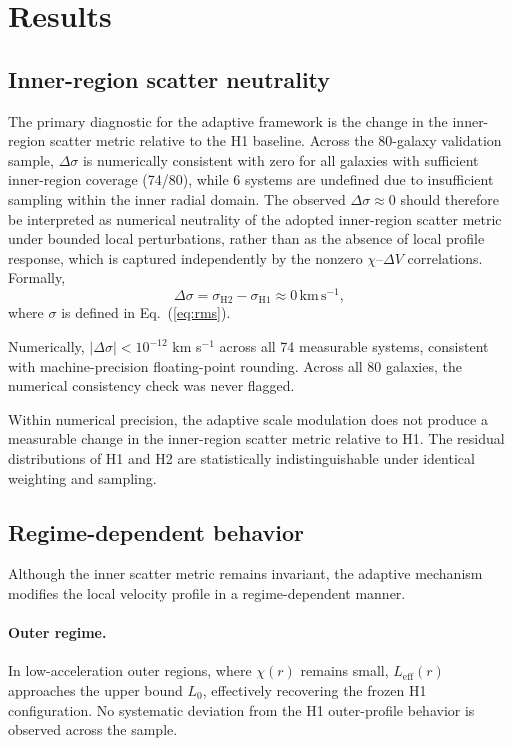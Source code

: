 \documentclass{aa}
\begin{document}
\section{Results}

\subsection{Inner-region scatter neutrality}

The primary diagnostic for the adaptive framework is the change in the
inner-region scatter metric relative to the H1 baseline. Across the
80-galaxy validation sample, $\Delta\sigma$ is numerically consistent
with zero for all galaxies with sufficient inner-region coverage (74/80),
while 6 systems are undefined due to insufficient sampling within the
inner radial domain.
The observed $\Delta\sigma \approx 0$ should therefore be interpreted as numerical neutrality of the adopted inner-region scatter metric under bounded local perturbations, rather than as the absence of local profile response, which is captured independently by the nonzero $\chi$--$\Delta V$ correlations. Formally,
\begin{equation}
	\Delta\sigma = \sigma_{\mathrm{H2}} - \sigma_{\mathrm{H1}}
	\approx 0\,\mathrm{km\,s^{-1}},
	\label{eq:delta_sigma}
\end{equation}
where $\sigma$ is defined in Eq.~(\ref{eq:rms}).

Numerically, $|\Delta\sigma| < 10^{-12}$ km s$^{-1}$ across all 74
measurable systems, consistent with machine-precision floating-point
rounding. Across all 80 galaxies, the numerical consistency check was
never flagged.

Within numerical precision, the adaptive scale modulation does not produce
a measurable change in the inner-region scatter metric relative to H1.
The residual distributions of H1 and H2 are statistically indistinguishable
under identical weighting and sampling.

\subsection{Regime-dependent behavior}

Although the inner scatter metric remains invariant, the adaptive mechanism
modifies the local velocity profile in a regime-dependent manner.

\paragraph{Outer regime.}
In low-acceleration outer regions, where $\chi(r)$ remains small, 
$L_{\mathrm{eff}}(r)$ approaches the upper bound $L_0$, effectively 
recovering the frozen H1 configuration. No systematic deviation from 
the H1 outer-profile behavior is observed across the sample.
\end{document}
